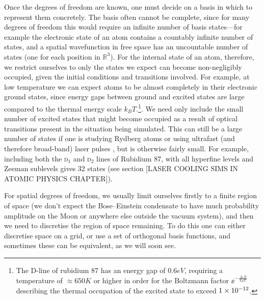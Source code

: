 Once the degrees of freedom are known, one must decide on a basis in which to represent them concretely. The basis often cannot be complete, since for many degrees of freedom this would require an infinite number of basis states---for example the electronic state of an atom contains a countably infinite number of states, and a spatial wavefunction in free space has an uncountable number of states (one for each position in $\mathbb{R}^3$). For the internal state of an atom, therefore, we restrict ourselves to only the states we expect can become non-negligibly occupied, given the initial conditions and transitions involved. For example, at low temperature we can expect atoms to be almost completely in their electronic ground states, since energy gaps between ground and excited states are large compared to the thermal energy scale $k_B T$.\footnote{The D-line of rubidium 87 has an energy gap of $0.6\unit{eV}$, requiring a temperature of $\approx 650\unit{K}$ or higher in order for the Boltzmann factor $\ee^{-\frac{\upDelta E}{k_B T}}$ describing the thermal occupation of the excited state to exceed $1\times 10^{-12}$.}. We need only include the small number of excited states that might become occupied as a result of optical transitions present in the situation being simulated. This can still be a large number of states if one is studying Rydberg atoms \cite{saffman_quantum_2010, urban_observation_2009} or using ultrafast (and therefore broad-band) laser pulses \cite{blinov_broadband_2006, mcculloch_high-coherence_2013, brabec_intense_2000}, but is otherwise fairly small. For example, including both the \textsc{d}$_1$ and \textsc{d}$_2$ lines of Rubidium 87, with all hyperfine levels and Zeeman sublevels gives 32 states (see section [LASER COOLING SIMS IN ATOMIC PHYSICS CHAPTER]).

For spatial degrees of freedom, we usually limit ourselves firstly to a finite region of space (we don't expect the Bose--Einstein condensate to have much probability amplitude on the Moon or anywhere else outside the vacuum system), and then we need to discretise the region of space remaining. To do this one can either discretise space on a grid, or use a set of orthogonal basis functions, and sometimes these can be equivalent, as we will soon see.

